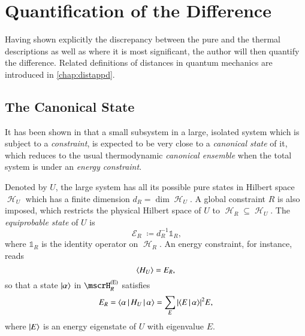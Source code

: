 \chapter{Quantification of the Difference}
\label{chap:quantifing}

Having shown explicitly the discrepancy between the pure and the thermal 
descriptions as well as where it is most significant, the author will then
quantify the difference. Related definitions of distances in quantum 
mechanics are introduced in \cref{chap:distappd}.

\section{The Canonical State} %
\label{sec:arbitrary-canonical}

It has been shown in \cite{Popescu2006} that a small subsystem in a large, 
isolated system which is subject to a \emph{constraint}, is expected to be very 
close to a \emph{canonical state} of it, which reduces to the usual 
thermodynamic \emph{canonical ensemble} when the total system is under an 
\emph{energy constraint}.

Denoted by $U$, the large system has all its possible pure states in Hilbert 
space $\mscrH_U$ which has a finite dimension $d_R = \dim \mscrH_U$. A global 
constraint $R$ is also imposed, which restricts the physical Hilbert space of 
$U$ to $\mscrH_R \subseteq \mscrH_U$. The \emph{equiprobable state} of $U$ is
\begin{equation}
\mscrE_R \coloneqq d_R^{-1} \Bbbone_R,
\end{equation}
where $\Bbbone_R$ is the identity operator on $\mscrH_R$. An energy constraint, 
for instance, reads
\begin{equation}
{\left<H_U\right>} = E_R,
\label{eq:ene-constraint}
\end{equation}
so that a state $\Ket{\alpha}$ in $\mscrH_R^{\rbr{\text{E}}}$ satisfies
\begin{equation}
E_R = \Braket{\alpha | H_U | \alpha} = \sum_E {\left|\Braket{E | \alpha}\right|}^2 E,
\end{equation}
where $\Ket{E}$ is an energy eigenstate of $U$ with eigenvalue $E$.

